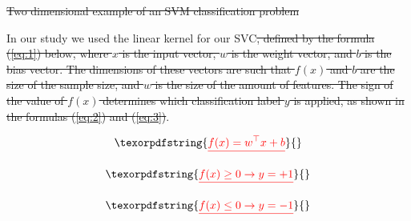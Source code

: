 \documentclass[review]{elsarticle}
\providecommand{\DIFdeltex}[1]{{\protect\color{red}\sout{#1}}}                      %
\providecommand{\DIFaddbegin}{} %
\providecommand{\DIFdelbegin}{} %
\providecommand{\DIFdelend}{} %
\providecommand{\DIFdelFL}[1]{\DIFdel{#1}} %
\providecommand{\DIFdel}[1]{\texorpdfstring{\DIFdeltex{#1}}{}} %
\newcommand{\DIFscaledelfig}{0.5}
\newlength{\DIFdelgraphicswidth} %
\newlength{\DIFdelgraphicsheight} %
\newcommand{\DIFaddincludegraphics}[2][]{{\color{blue}\fbox{\DIFOincludegraphics[#1]{#2}}}} %
\newcommand{\DIFdelincludegraphics}[2][]{%
\sbox{\DIFdelgraphicsbox}{\DIFOincludegraphics[#1]{#2}}%
\settoboxwidth{\DIFdelgraphicswidth}{\DIFdelgraphicsbox} %
\settoboxtotalheight{\DIFdelgraphicsheight}{\DIFdelgraphicsbox} %
\scalebox{\DIFscaledelfig}{%
\parbox[b]{\DIFdelgraphicswidth}{\usebox{\DIFdelgraphicsbox}\\[-\baselineskip] \rule{\DIFdelgraphicswidth}{0em}}\llap{\resizebox{\DIFdelgraphicswidth}{\DIFdelgraphicsheight}{%
\setlength{\unitlength}{\DIFdelgraphicswidth}%
\begin{picture}(1,1)%
\thicklines\linethickness{2pt} %
{\color[rgb]{1,0,0}\put(0,0){\framebox(1,1){}}}%
{\color[rgb]{1,0,0}\put(0,0){\line( 1,1){1}}}%
{\color[rgb]{1,0,0}\put(0,1){\line(1,-1){1}}}%
\end{picture}%
}\hspace*{3pt}}} %
} %
\DeclareRobustCommand{\DIFaddbegin}{\DIFOaddbegin \let\includegraphics\DIFaddincludegraphics} %
\DeclareRobustCommand{\DIFdelbegin}{\DIFOdelbegin \let\includegraphics\DIFdelincludegraphics} %
\DeclareRobustCommand{\DIFdelend}{\DIFOaddend \let\includegraphics\DIFOincludegraphics} %
\begin{document}
{%
\DIFdelFL{Two dimensional example of an SVM classification problem}}

\DIFdelend In our study we used the linear kernel for our SVC\DIFdelbegin \DIFdel{, defined by the formula (\ref{eq:1}) below, where \(x\) is the input vector, \(w\) is the weight vector, and \(b\) is the bias vector. The dimensions of these vectors are such that \(f(x)\) and \(b\) are the size of the sample size, and \(w\) is the size of the amount of features. The sign of the value of \(f(x)\) determines which classification label \(y\) is applied, as shown in the formulas (\ref{eq:2}) and (\ref{eq:3})}\DIFdelend .

\DIFdelbegin \begin{displaymath}\DIFdel{%
f(x) = w^\top x + b
}\end{displaymath}
\DIFdelend %

\DIFdelbegin \begin{displaymath}\DIFdel{%
f(x)\geq 0 \rightarrow y= +1 
}\end{displaymath}
\DIFdelend %

\DIFdelbegin \begin{displaymath}\DIFdel{%
f(x)\leq 0 \rightarrow y= -1 
}\end{displaymath}

\DIFaddbegin 
\end{document}
